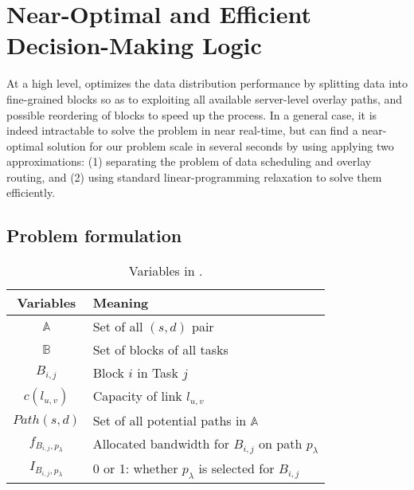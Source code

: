 \section{Near-Optimal and Efficient Decision-Making Logic}
\label{sec:logic}

At a high level, \name optimizes the data distribution performance by splitting data into fine-grained blocks so as to exploiting all available server-level overlay paths, and possible reordering of blocks to speed up the process.
In a general case, it is indeed intractable to solve the problem in near real-time, but \name can find a near-optimal solution for our problem scale in several seconds by using applying two approximations: (1) separating the problem of data scheduling and overlay routing, and (2) using standard linear-programming relaxation to solve them efficiently.


\subsection{Problem formulation}
\label{subsec:logic:formulation}

\begin{table}[t]
\begin{center}
\begin{tabular}{| c | l|}
\hline
 \rowcolor[gray]{0.9}
\textbf{Variables} & \textbf{Meaning} \\
\hline \hline
\textit{$\mathbb{A}$} & Set of all $(s, d)$ pair\\
\hline
\textit{$\mathbb{B}$} & Set of blocks of all tasks\\
\hline
\textit{$B_{i,j}$} & Block $i$ in Task $j$\\
\hline
\textit{$c(l_{u,v})$} & Capacity of link $l_{u,v}$\\
\hline
\textit{$Path(s,d)$} & Set of all potential paths in $\mathbb{A}$\\
\hline
\textit{$f_{B_{i,j},p_\lambda}$} & Allocated bandwidth for $B_{i,j}$ on path $p_\lambda$\\
\hline
\textit{$I_{B_{i,j},p_\lambda}$} & 0 or 1: whether $p_\lambda$ is selected for $B_{i,j}$\\
\hline
\end{tabular}
\end{center}
\caption{Variables in \name.}
\label{table:para}
\end{table}

